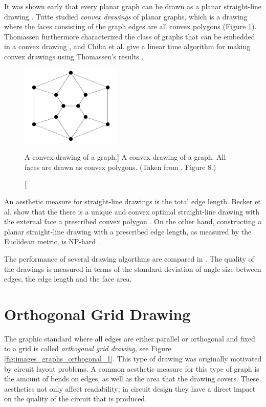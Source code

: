 It was shown early that every planar graph can be drawn as a planar
straight-line drawing \cite{Wagner1936,Fary1948,Stein1951}. Tutte studied
\emph{convex drawings} of planar graphs, which is a drawing where the faces
consisting of the graph edges are all convex polygons \cite{Tutte1960} (Figure
\ref{fig:images_graphs_convex_1}). Thomassen furthermore characterized the
class of graphs that can be embedded in a convex drawing \cite{Thomassen1980},
and Chiba et al. give a linear time algorithm for making convex drawings using
Thomassen's results \cite{Chiba1984}.
\begin{figure}[htp]
	\centering
		\includegraphics[height=1.5in]{../images/graphs/convex_1.png}
	\caption
	[A convex drawing of a graph.]
	{A convex drawing of a graph. All faces are drawn as convex 
	polygons. (Taken from \cite{DiBattista1994}, Figure 8.)}
	\label{fig:images_graphs_convex_1}
\end{figure}

An aesthetic measure for straight-line drawings is the total edge length.
Becker et al. show that the there is a unique and convex optimal straight-line
drawing with the external face a prescribed convex polygon \cite{Becker1987}.
On the other hand, constructing a planar straight-line drawing with a
prescribed edge length, as measured by the Euclidean metric, is NP-hard
\cite{Eades1990}. 

The performance of several drawing algorthms are compared in \cite{Jones1991}.
The quality of the drawings is measured in terms of the standard deviation of
angle size between edges, the edge length and the face area.

\section{Orthogonal Grid Drawing}

The graphic standard where all edges are either parallel or orthogonal and
fixed to a grid is called \emph{orthogonal grid drawing}, see Figure
\ref{fig:images_graphs_orthogonal_1}. This type of drawing was originally
motivated by circuit layout problems. A common aesthetic measure for this type
of graph is the amount of bends on edges, as well as the area that the drawing
covers. These aesthetics not only affect readability; in circuit design they
have a direct impact on the quality of the circuit that is produced.

